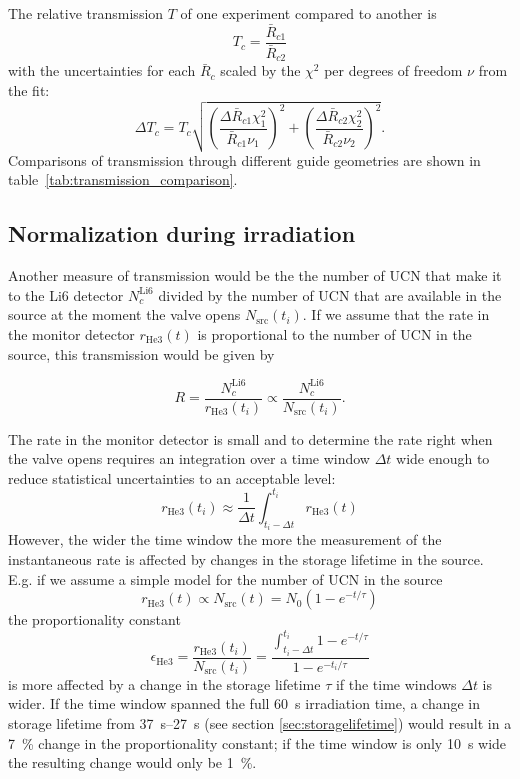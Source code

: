 \documentclass[10pt,letterpaper]{article}
\begin{document}
The relative transmission $T$ of one experiment compared to another is
\begin{equation}
T_c = \frac{\bar{R}_{c1}}{\bar{R}_{c2}}
\end{equation}
with the uncertainties for each $\bar{R}_c$ scaled by the $\chi^2$ per degrees of freedom $\nu$ from the fit:
\begin{equation}
\label{eq:transmission_end}
\Delta T_c = T_c \sqrt{ \left( \frac{\Delta \bar{R}_{c1} \chi_1^2}{\bar{R}_{c1} \nu_1} \right)^2 + \left( \frac{\Delta \bar{R}_{c2} \chi_2^2}{\bar{R}_{c2} \nu_2} \right)^2 }.
\end{equation}
Comparisons of transmission through different guide geometries are shown in table~\ref{tab:transmission_comparison}.


\subsection{Normalization during irradiation}

Another measure of transmission would be the the number of UCN that make it to the Li6 detector $N^\mathrm{Li6}_c$ divided by the number of UCN that are available in the source at the moment the valve opens $N_\mathrm{src}(t_i)$.
If we assume that the rate in the monitor detector $r_\mathrm{He3}(t)$ is proportional to the number of UCN in the source, this transmission would be given by

\begin{equation}
R = \frac{N_c^\mathrm{Li6}}{r_\mathrm{He3}(t_i)} \propto \frac{N_c^\mathrm{Li6}}{N_\mathrm{src}(t_i)} .
\end{equation}

The rate in the monitor detector is small and to determine the rate right when the valve opens requires an integration over a time window $\Delta t$ wide enough to reduce statistical uncertainties to an acceptable level:
\begin{equation}
r_\mathrm{He3}(t_i) \approx \frac{1}{\Delta t} \int_{t_i - \Delta t}^{t_i}  r_\mathrm{He3}(t)
\end{equation}
However, the wider the time window the more the measurement of the instantaneous rate is affected by changes in the storage lifetime in the source. E.g. if we assume a simple model for the number of UCN in the source
\begin{equation}
r_\mathrm{He3}(t) \propto N_\mathrm{src}(t) = N_0 \left( 1 - e^{-t/\tau} \right)
\end{equation}
the proportionality constant
\begin{equation}
\epsilon_\mathrm{He3} = \frac{r_\mathrm{He3}(t_i)}{N_\mathrm{src}(t_i)} = \frac{\int_{t_i - \Delta t}^{t_i} 1 - e^{-t/\tau}}{1 - e^{-t_i/\tau}}
\end{equation}
is more affected by a change in the storage lifetime $\tau$ if the time windows $\Delta t$ is wider. If the time window spanned the full \SI{60}{\second} irradiation time, a change in storage lifetime from \SIrange{37}{27}{\second} (see section \ref{sec:storagelifetime}) would result in a \SI{7}{\percent} change in the proportionality constant; if the time window is only \SI{10}{\second} wide the resulting change would only be \SI{1}{\percent}.
\end{document}
